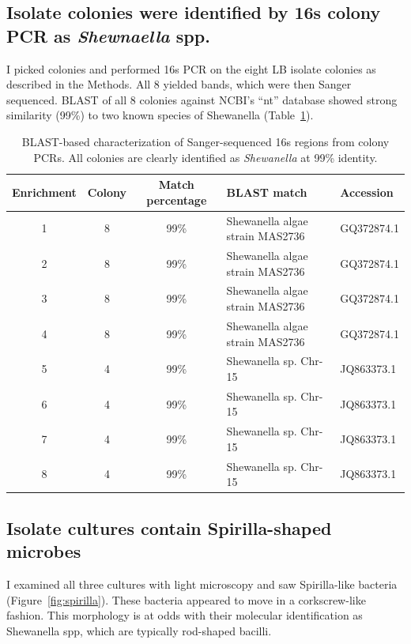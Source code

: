 \documentclass{article}
\begin{document}
\subsection*{Isolate colonies were identified by 16s colony PCR as {\em Shewnaella} spp.}

I picked colonies and performed 16s PCR on the eight LB isolate
colonies as described in the Methods.  All 8 yielded bands, which were
then Sanger sequenced.  BLAST of all 8 colonies against NCBI's ``nt''
database showed strong similarity (99\%) to two known species of
Shewanella (Table~\ref{tab:16s}).

\begin{table}
\centering
\begin{tabular}{|c|c|c|l|l|}
\hline
Enrichment & Colony & Match percentage & BLAST match & Accession \\
\hline
1 &
8 &
99\% &
Shewanella algae strain MAS2736 &
GQ372874.1 \\

2 &
8 &
99\% &
Shewanella algae strain MAS2736 &
GQ372874.1 \\

3 &
8 &
99\% &
Shewanella algae strain MAS2736 &
GQ372874.1 \\

4 &
8 &
99\% &
Shewanella algae strain MAS2736 &
GQ372874.1 \\

5 &
4 &
99\% &
Shewanella sp. Chr-15 &
JQ863373.1 \\

6 &
4 &
99\% &
Shewanella sp. Chr-15 &
JQ863373.1 \\

7 &
4 &
99\% &
Shewanella sp. Chr-15 &
JQ863373.1 \\

8 &
4 &
99\% &
Shewanella sp. Chr-15 &
JQ863373.1 \\
\hline
\end{tabular}
\caption{BLAST-based characterization of Sanger-sequenced 16s regions from colony PCRs.  All colonies are clearly identified as {\em Shewanella} at 99\% identity.}
\label{tab:16s}
\end{table}

\subsection*{Isolate cultures contain Spirilla-shaped microbes}

I examined all three cultures with light microscopy and saw
Spirilla-like bacteria (Figure~\ref{fig:spirilla}).  These bacteria
appeared to move in a corkscrew-like fashion.  This morphology is at
odds with their molecular identification as Shewanella spp, which are
typically rod-shaped bacilli.
\end{document}
